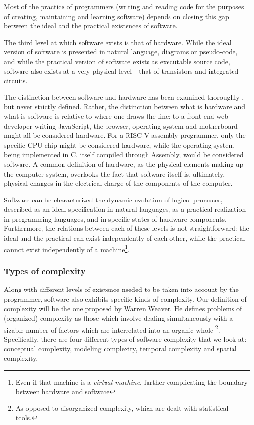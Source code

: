 Most of the practice of programmers (writing and reading code for the purposes of creating, maintaining and learning software) depends on closing this gap between the ideal and the practical existences of software.

The third level at which software exists is that of hardware. While the ideal version of software is presented in natural language, diagrams or pseudo-code, and while the practical version of software exists as executable source code, software also exists at a very physical level—that of transistors and integrated circuits.

The distinction between software and hardware has been examined thoroughly \citep{kittler_there_1997,chun_sourcery_2008,rapaport_philosophy_2005}, but never strictly defined. Rather, the distinction between what is hardware and what is software is relative to where one draws the line: to a front-end web developer writing JavaScript, the browser, operating system and motherboard might all be considered hardware. For a RISC-V assembly programmer, only the specific CPU chip might be considered hardware, while the operating system being implemented in C, itself compiled through Assembly, would be considered software. A common definition of hardware, as the physical elements making up the computer system, overlooks the fact that software itself is, ultimately, physical changes in the electrical charge of the components of the computer.

Software can be characterized the dynamic evolution of logical processes, described as an ideal specification in natural languages, as a practical realization in programming languages, and in specific states of hardware components. Furthermore, the relations between each of these levels is not straightforward: the ideal and the practical can exist independently of each other, while the practical cannot exist independently of a machine\footnote{Even if that machine is a \emph{virtual machine}, further complicating the boundary between hardware and software}.

\subsubsection{Types of complexity}
\label{subsubsec:types-complexity}

Along with different levels of existence needed to be taken into account by the programmer, software also exhibits specific kinds of complexity. Our definition of complexity will be the one proposed by Warren Weaver. He defines problems of (organized) complexity as those which involve dealing simultaneously with a sizable number of factors which are interrelated into an organic whole \citep{weaver_science_1948}\footnote{As opposed to disorganized complexity, which are dealt with statistical tools.}. Specifically, there are four different types of software complexity that we look at: conceptual complexity, modeling complexity, temporal complexity and spatial complexity.

